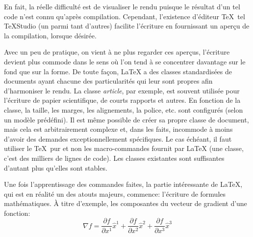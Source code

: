 	En fait, la réelle difficulté est de visualiser le rendu puisque le résultat d'un tel code n'est connu qu'après compilation. Cependant, l'existence d'éditeur \TeX~tel TeXStudio (un parmi tant d'autres) facilite l'écriture en fournissant un aperçu de la compilation, lorsque désirée.
	\par Avec un peu de pratique, on vient à ne plus regarder ces aperçus, l'écriture devient plus commode dans le sens où l'on tend à se concentrer davantage sur le fond que sur la forme. De toute façon, \LaTeX{} a des classes standardisées de documents ayant chacune des particularités qui leur sont propres afin d'harmoniser le rendu. La classe \textit{article}, par exemple, est souvent utilisée pour l'écriture de papier scientifique, de courts rapports et autres. En fonction de la classe, la taille, les marges, les alignements, la police, etc. sont configurés (selon un modèle prédéfini). Il est même possible de créer sa propre classe de document, mais cela est arbitrairement complexe et, dans les faits, incommode à moins d'avoir des demandes exceptionnellement spécifiques. Le cas échéant, il faut utiliser le \TeX~pur et non les macro-commandes fournit par \LaTeX{} (une classe, c'est des milliers de lignes de code). Les classes existantes sont suffisantes d'autant plus qu'elles sont stables. 
	\par Une fois l'apprentissage des commandes faites, la partie intéressante de \LaTeX, qui est en réalité un des atouts majeurs, commence: l'écriture de formules mathématiques. À titre d'exemple, les composantes du vecteur de gradient d'une fonction:
	\begin{equation}\label{eq:exemple}
	\nabla f =%
	\frac{\partial f}{\partial x^1}\widehat{x}^1%
	+\frac{\partial f}{\partial x^2}\widehat{x}^2%
	+\frac{\partial f}{\partial x^3}\widehat{x}^3
	\end{equation}
